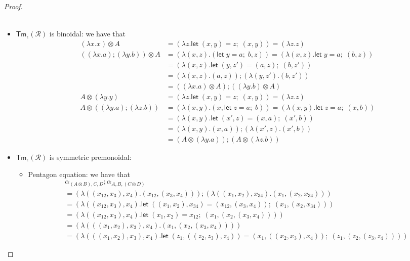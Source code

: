 \documentclass[acmsmall,screen,anonymous,review]{acmart}
\newcommand{\mc}[1]{\ensuremath{\mathcal{#1}}}
\newcommand{\ms}[1]{\ensuremath{\mathsf{#1}}}
\newcommand{\letexpr}[3]{\ensuremath{\ms{let}\;#1 = #2;\;#3}}
\begin{document}
\begin{proof}
\begin{itemize}
\begin{align*}
  \end{align*}
  \item $\ms{Tm}_\epsilon(\mc{R})$ is binoidal: we have that
  \begin{align*}
    (\lambda x . x) \otimes A 
    &= (\lambda z . \letexpr{(x, y)}{z}{(x, y)}) = (\lambda z . z)\
    \\
    ((\lambda x . a) ; (\lambda y . b)) \otimes A
    &= (\lambda (x, z) . (\letexpr{y}{a}{b}, z))
    = (\lambda (x, z) . \letexpr{y}{a}{(b, z)}) \\
    &= (\lambda (x, z) . \letexpr{(y, z')}{(a, z)}{(b, z')}) \\
    &= (\lambda (x, z) . (a, z)) ; (\lambda (y, z') . (b, z')) \\
    &= ((\lambda x . a) \otimes A) ; ((\lambda y  . b) \otimes A) \\
    A \otimes (\lambda y . y)
    &= (\lambda z . \letexpr{(x, y)}{z}{(x, y)}) = (\lambda z . z) \\
    A \otimes ((\lambda y . a) ; (\lambda z . b))
    &= (\lambda (x, y) . (x, \letexpr{z}{a}{b}))
    = (\lambda (x, y) . \letexpr{z}{a}{(x, b)}) \\
    &= (\lambda (x, y) . \letexpr{(x', z)}{(x, a)}{(x', b)}) \\
    &= (\lambda (x, y) . (x, a)) ; (\lambda (x', z) . (x', b)) \\
    &= (A \otimes (\lambda y . a)) ; (A \otimes (\lambda z . b)) 
  \end{align*}
  \item $\ms{Tm}_\epsilon(\mc{R})$ is symmetric premonoidal: 
  \begin{itemize}
    \item Pentagon equation: we have that
    \begin{align*}
      &\alpha_{(A \otimes B), C, D} ; \alpha_{A, B, (C \otimes D)} \\
      &= (\lambda ((x_{12}, x_3), x_4) . (x_{12}, (x_3, x_4))) ; 
         (\lambda ((x_1, x_2), x_{34}) . (x_1, (x_2, x_{34}))) \\
      &= (\lambda ((x_{12}, x_3), x_4) . 
        \letexpr{((x_1, x_2), x_{34})}{(x_{12}, (x_3, x_4))}{(x_1, (x_2, x_{34}))}) \\
      &= (\lambda ((x_{12}, x_3), x_4) . 
        \letexpr{(x_1, x_2)}{x_{12}}{(x_1, (x_2, (x_3, x_4)))}) \\
      &= (\lambda (((x_1, x_2), x_3), x_4) . (x_1, (x_2, (x_3, x_4)))) \\
      &= (\lambda (((x_1, x_2), x_3), x_4) . 
        \letexpr{(z_1, ((z_2, z_3), z_4))}{(x_1, ((x_2, x_3), x_4))}{(z_1, (z_2, (z_3, z_4)))})

\end{align*}
\end{itemize}
\end{itemize}
\end{proof}
\end{document}
